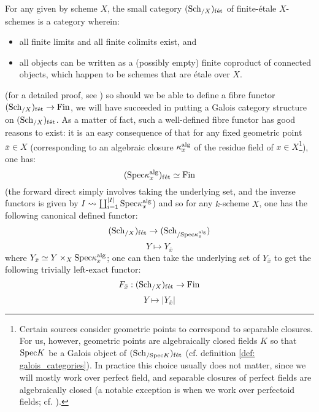         \begin{remark} \label{remark: finite_etale_schemes}
            For any given by scheme $X$, the small category $(\mathrm{Sch}_{/X})_{\mathrm{f\acute{e}t}}$ of finite-\'etale $X$-schemes is a category wherein:
                \begin{itemize}
                    \item all finite limits and all finite colimits exist, and
                    \item all objects can be written as a (possibly empty) finite coproduct of connected objects, which happen to be schemes that are \'etale over $X$.  
                \end{itemize}
            (for a detailed proof, see \cite[\href{https://stacks.math.columbia.edu/tag/0BN9}{Tag 0BN9}]{stacks}) so should we be able to define a fibre functor $(\mathrm{Sch}_{/X})_{\mathrm{f\acute{e}t}} \to \mathrm{Fin}$, we will have succeeded in putting a Galois category structure on $(\mathrm{Sch}_{/X})_{\mathrm{f\acute{e}t}}$. As a matter of fact, such a well-defined fibre functor has good reasons to exist: it is an easy consequence of \cite[\href{https://stacks.math.columbia.edu/tag/00U3}{Tag 00U3}]{stacks} that for any fixed geometric point $\bar{x} \in X$ (corresponding to an algebraic closure $\kappa_x^{\mathrm{alg}}$ of the residue field of $x \in X$\footnote{Certain sources consider geometric points to correspond to separable closures. For us, however, geometric points are algebraically closed fields $K$ so that $\mathrm{Spec} K$ be a Galois object of $(\mathrm{Sch}_{/\mathrm{Spec} K})_{\mathrm{f\acute{e}t}}$ (cf. definition \ref{def: galois_categories}). In practice this choice usually does not matter, since we will mostly work over perfect field, and separable closures of perfect fields are algebraically closed (a notable exception is when we work over perfectoid fields; cf. \cite{scholze2011perfectoid}).}), one has:
                $$(\mathrm{Spec} \kappa_x^{\mathrm{alg}})_{\mathrm{f\acute{e}t}} \simeq \mathrm{Fin}$$
            (the forward direct simply involves taking the underlying set, and the inverse functors is given by $I \leadsto \coprod_{i = 1}^{|I|} \mathrm{Spec} \kappa_x^{\mathrm{alg}}$) and so for any $k$-scheme $X$, one has the following canonical defined functor:
                $$(\mathrm{Sch}_{/X})_{\mathrm{f\acute{e}t}} \to (\mathrm{Sch}_{/\mathrm{Spec} \kappa_x^{\mathrm{alg}}})$$
                $$Y \mapsto Y_{\bar{x}}$$
            where $Y_{\bar{x}} \cong Y \x_X \Spec \kappa_x^{\alg}$; one can then take the underlying set of $Y_{\bar{x}}$ to get the following trivially left-exact functor:
                $$F_{\bar{x}}: (\mathrm{Sch}_{/X})_{\mathrm{f\acute{e}t}} \to \mathrm{Fin}$$
                $$Y \mapsto |Y_{\bar{x}}|$$

\end{remark}
